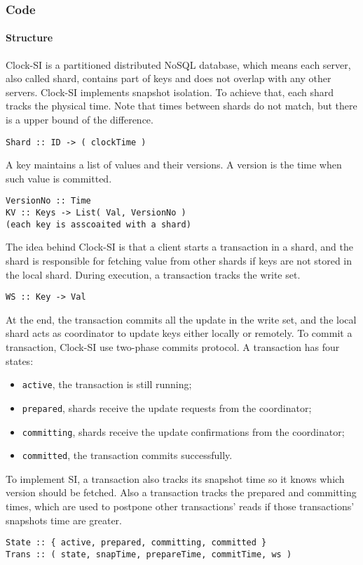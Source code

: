 \subsubsection{Code}

\paragraph{\bf Structure}
Clock-SI is a partitioned distributed NoSQL database, which means 
each server, also called shard, contains part of keys and does not overlap with any other servers.
Clock-SI implements snapshot isolation.
To achieve that, each shard tracks the physical time.
Note that times between shards do not match,
but there is a upper bound of the difference.
\begin{lstlisting}[caption={Shard},label={lst:clock-si-shard}]
Shard :: ID -> ( clockTime )
\end{lstlisting}
A key maintains a list of values and their versions.
A version is the time when such value is committed.
\begin{lstlisting}[caption={Key-value store},label={lst:clock-si-key-value-store}]
VersionNo :: Time
KV :: Keys -> List( Val, VersionNo )
(each key is asscoaited with a shard)
\end{lstlisting}
The idea behind Clock-SI is that
a client starts a transaction in a shard, 
and the shard is responsible for fetching value from other shards
if keys are not stored in the local shard.
During execution, a transaction tracks the write set.
\begin{lstlisting}[caption={Write set},label={lst:clock-si-write-set}]
WS :: Key -> Val
\end{lstlisting}
At the end, the transaction commits all the update in the write set,
and the local shard acts as coordinator to update keys either locally or remotely.
To commit a transaction, Clock-SI use two-phase commits protocol.
A transaction has four states:
\begin{itemize}
    \item \verb|active|, the transaction is still running;
    \item \verb|prepared|, shards receive the update requests from the coordinator;
    \item \verb|committing|, shards receive the update confirmations from the coordinator;
    \item \verb|committed|, the transaction commits successfully.
\end{itemize}
To implement SI, a transaction also tracks its snapshot time 
so it knows which version should be fetched.
Also a transaction tracks the prepared and committing times,
which are used to postpone other transactions' reads 
if those transactions' snapshots time are greater.
\begin{lstlisting}[caption={Transaction runtime},label={lst:clock-si-state}]
State :: { active, prepared, committing, committed }
Trans :: ( state, snapTime, prepareTime, commitTime, ws )
\end{lstlisting}

